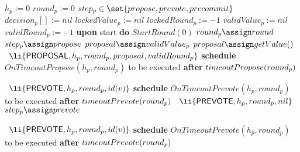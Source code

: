 \begin{algorithm}[htb!] \def\baselinestretch{1} \scriptsize\raggedright
	\begin{algorithmic}[1] 
		\SHORTSPACE 
		\INIT{} 
		\STATE $h_p := 0$
		\STATE $round_p := 0$   
		\STATE $step_p  \in \set{\propose, \prevote, \precommit}$
		\STATE $decision_p[] := nil$ 
		\STATE $lockedValue_p := nil$ 
		\STATE $lockedRound_p := -1$ 
		\STATE $validValue_p := nil$ 
		\STATE $validRound_p := -1$ 
		\ENDINIT 
		\SHORTSPACE 
		\STATE \textbf{upon} start \textbf{do} $StartRound(0)$ 
		\SHORTSPACE 
		 \label{line:tab:startRound} 
		\STATE $round_p \assign round$ 
		\STATE $step_p \assign \propose$
		 \label{line:tab:isThereLockedValue}
		\STATE $proposal \assign validValue_p$
		\ELSE \STATE $proposal \assign
		getValue()$ 
		\label{line:tab:getValidValue} 
		\ENDIF 	  
		\STATE \Broadcast\ $\li{\Proposal,h_p, round_p, proposal, validRound_p}$
		\label{line:tab:send-proposal} 
		\ELSE 
		\STATE \textbf{schedule} $OnTimeoutPropose(h_p,
		round_p)$ to be executed \textbf{after} $\timeoutPropose(round_p)$ 
		\ENDIF
		\ENDFUNCTION
		
		\SPACE 
		 \label{line:tab:recvProposal}
			\label{line:tab:accept-proposal-2} 
				\STATE \Broadcast \ $\li{\Prevote,h_p,round_p,id(v)}$  
				\label{line:tab:prevote-proposal}	
				\color{red}\STATE \textbf{schedule} $OnTimeoutPrevote(h_p, round_p)$ to be executed \textbf{after}  $\timeoutPrevote(round_p)$ \label{line:tab:timeoutPrevote-1}
			\ELSE
			\label{line:tab:acceptProposal1}		
				\STATE \Broadcast \ $\li{\Prevote,h_p,round_p,\nil}$  
				\label{line:tab:prevote-nil}	
			\ENDIF
				\STATE $step_p \assign \prevote$ \label{line:tab:setStateToPrevote1} 
		\ENDUPON
		
		\SPACE 
		\label{line:tab:acceptProposal} 
		 \label{line:tab:cond-prevote-higher-proposal}	
			\STATE \Broadcast \ $\li{\Prevote,h_p,round_p,id(v)}$
			\label{line:tab:prevote-higher-proposal}
			\color{red}\STATE \textbf{schedule} $OnTimeoutPrevote(h_p, round_p)$ to be executed \textbf{after}  $\timeoutPrevote(round_p)$ \label{line:tab:timeoutPrevote-2}
					 

\end{algorithmic}
\end{algorithm}
